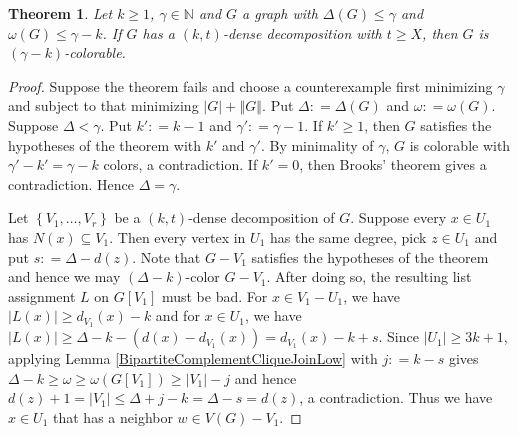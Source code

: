 \documentclass[12pt]{article}
\theoremstyle{plain}
\newtheorem{thm}{Theorem}[section]
\theoremstyle{definition}
\theoremstyle{remark}
\newcommand{\IN}{\mathbb{N}}
\newcommand{\set}[1]{\left\{ #1 \right\}}
\newcommand{\card}[1]{\left|#1\right|}
\newcommand{\size}[1]{\left\Vert#1\right\Vert}
\newcommand{\DefinedAs}{\mathrel{\mathop:}=}
\begin{document}
\begin{thm}
Let $k \ge 1$, $\gamma \in \IN$ and $G$ a graph with $\Delta(G) \le \gamma$ and $\omega(G) \le \gamma - k$. If $G$ has a $(k,t)$-dense decomposition with $t \ge X$, then $G$ is $(\gamma-k)$-colorable.
\end{thm}
\begin{proof}
Suppose the theorem fails and choose a counterexample first minimizing $\gamma$ and subject to that minimizing $\card{G} + \size{G}$.  Put $\Delta \DefinedAs \Delta(G)$ and $\omega \DefinedAs \omega(G)$.  Suppose $\Delta < \gamma$.  Put $k' \DefinedAs k - 1$ and $\gamma' \DefinedAs \gamma - 1$.  If $k' \ge 1$, then $G$ satisfies the hypotheses of the theorem with $k'$ and $\gamma'$.  By minimality of $\gamma$, $G$ is colorable with $\gamma' - k' = \gamma - k$ colors, a contradiction.  If $k' = 0$, then Brooks' theorem gives a contradiction.  Hence $\Delta = \gamma$.

Let $\set{V_1, \ldots, V_r}$ be a $(k,t)$-dense decomposition of $G$.  Suppose every $x \in U_1$ has $N(x) \subseteq V_1$. Then every vertex in $U_1$ has the same degree, pick $z \in U_1$ and put $s \DefinedAs \Delta - d(z)$.  Note that $G-V_1$ satisfies the hypotheses of the theorem and hence we may $(\Delta-k)$-color $G-V_1$.  After doing so, the resulting list assignment $L$ on $G[V_1]$ must be bad.   For $x \in V_1 - U_1$, we have $\card{L(x)} \ge d_{V_1}(x) - k$ and for $x \in U_1$, we have $\card{L(x)} \ge \Delta - k - (d(x) - d_{V_1}(x)) = d_{V_1}(x) - k + s$. Since $\card{U_1} \geq 3k+1$, applying Lemma \ref{BipartiteComplementCliqueJoinLow} with $j \DefinedAs k-s$ gives $\Delta-k \ge \omega \ge \omega(G[V_1]) \ge |V_1| - j$ and hence $d(z) + 1 = |V_1| \le \Delta + j - k = \Delta - s = d(z)$, a contradiction.  Thus we have $x \in U_1$ that has a neighbor $w \in V(G) - V_1$.


\end{proof}
\end{document}
